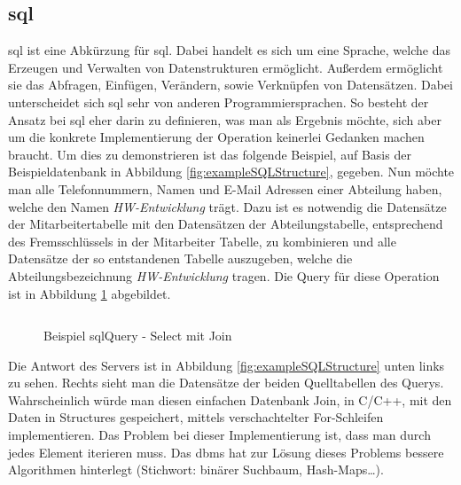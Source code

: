 \subsection{\acs{sql}}\label{subsec:sql}
\acs{sql} ist eine Abkürzung für \acl{sql}. Dabei handelt es sich um eine Sprache, 
welche das Erzeugen und Verwalten von Datenstrukturen ermöglicht. 
Außerdem ermöglicht sie das Abfragen, Einfügen, Verändern, sowie Verknüpfen von Datensätzen.
Dabei unterscheidet sich \ac{sql} sehr von anderen Programmiersprachen.
So besteht der Ansatz bei \ac{sql} eher darin zu definieren, was man als Ergebnis möchte, 
sich aber um die konkrete Implementierung der Operation keinerlei Gedanken machen braucht.
Um dies zu demonstrieren ist das folgende Beispiel, auf Basis der Beispieldatenbank in Abbildung \ref{fig:exampleSQLStructure}, gegeben.
Nun möchte man alle Telefonnummern, Namen und E-Mail Adressen einer Abteilung haben, welche den Namen \emph{HW-Entwicklung} trägt.
Dazu ist es notwendig die Datensätze der Mitarbeitertabelle mit den Datensätzen der Abteilungstabelle, 
entsprechend des Fremsschlüssels in der Mitarbeiter Tabelle, zu kombinieren und alle Datensätze der so entstandenen Tabelle auszugeben, 
welche die Abteilungsbezeichnung \emph{HW-Entwicklung} tragen. 
Die Query für diese Operation ist in Abbildung \ref{fig:exampleSQLQuery} abgebildet.
\begin{figure}[hbt]
  \inputminted{sql}{content/hauptteil/theoretischeGrundlagen/rec/sqlQuery.sql}
  \caption{Beispiel sqlQuery - Select mit Join}
  \label{fig:exampleSQLQuery}
\end{figure}
Die Antwort des Servers ist in Abbildung \ref{fig:exampleSQLStructure} unten links zu sehen.
Rechts sieht man die Datensätze der beiden Quelltabellen des Querys.
Wahrscheinlich würde man diesen einfachen Datenbank Join, in C/C++, mit den Daten in Structures gespeichert, mittels verschachtelter For-Schleifen implementieren. 
Das Problem bei dieser Implementierung ist, dass man durch jedes Element iterieren muss.
Das \ac{dbms} hat zur Lösung dieses Problems bessere Algorithmen hinterlegt (Stichwort: binärer Suchbaum, Hash-Maps\dots).

